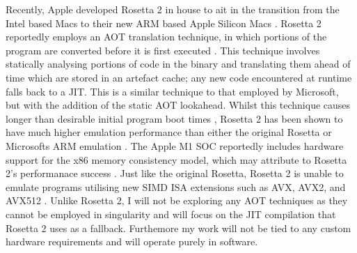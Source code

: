 Recently, Apple developed Rosetta 2 \cite{rosetta2} in house to ait in the transition from the Intel based Macs to their new ARM based Apple Silicon Macs \cite{rosetta2, apple-silicon}. Rosetta 2 reportedly employs an AOT translation technique, in which portions of the program are converted before it is first executed \cite{rosetta2-aot, ars-technica-big-sur}. This technique involves statically analysing portions of code in the binary and translating them ahead of time which are stored in an artefact cache; any new code encountered at runtime falls back to a JIT. This is a similar technique to that employed by Microsoft, but with the addition of the static AOT lookahead. Whilst this technique causes longer than desirable initial program boot times \cite{rosetta2-slow-launch}, Rosetta 2 has been shown to have much higher emulation performance than either the original Rosetta or Microsofts ARM emulation \cite{rosetta2-perf}. The Apple M1 SOC reportedly includes hardware support for the x86 memory consistency model, which may attribute to Rosetta 2's performanace success \cite{rosetta2-infoq}. Just like the original Rosetta, Rosetta 2 is unable to emulate programs utilising new SIMD ISA extensions such as AVX, AVX2, and AVX512 \cite{rosetta2}. Unlike Rosetta 2, I will not be exploring any AOT techniques as they cannot be employed in singularity and will focus on the JIT compilation that Rosetta 2 uses as a fallback. Furthemore my work will not be tied to any custom hardware requirements and will operate purely in software.